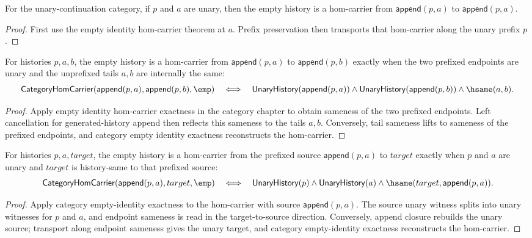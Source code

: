 \begin{theorem}
\label{thm:functor-prefix-hom-carrier-empty-identity-preserves}
For the unary-continuation category, if \(p\) and \(a\) are unary, then the
empty history is a hom-carrier from \(\mathsf{append}(p,a)\) to
\(\mathsf{append}(p,a)\).
\end{theorem}
\begin{proof}
First use the empty identity hom-carrier theorem at \(a\). Prefix preservation
then transports that hom-carrier along the unary prefix \(p\).
\end{proof}

\begin{theorem}
\label{thm:functor-prefix-hom-carrier-empty-identity-iff}
For histories \(p,a,b\), the empty history is a hom-carrier from
\(\mathsf{append}(p,a)\) to \(\mathsf{append}(p,b)\) exactly when the two
prefixed endpoints are unary and the unprefixed tails \(a,b\) are internally
the same:
$$
\mathsf{CategoryHomCarrier}(\mathsf{append}(p,a),\mathsf{append}(p,b),\emp)
\quad\Longleftrightarrow\quad
\mathsf{UnaryHistory}(\mathsf{append}(p,a))\wedge
\mathsf{UnaryHistory}(\mathsf{append}(p,b))\wedge \hsame(a,b).
$$
\end{theorem}
\begin{proof}
Apply empty identity hom-carrier exactness in the category chapter to obtain
sameness of the two prefixed endpoints. Left cancellation for generated-history
append then reflects this sameness to the tails \(a,b\). Conversely, tail
sameness lifts to sameness of the prefixed endpoints, and category empty
identity exactness reconstructs the hom-carrier.
\end{proof}

\begin{theorem}
\label{thm:functor-prefix-hom-carrier-empty-morphism-target-exactness}
For histories $p,a,target$, the empty history is a hom-carrier from the
prefixed source $\mathsf{append}(p,a)$ to $target$ exactly when $p$ and $a$ are
unary and $target$ is history-same to that prefixed source:
$$
\mathsf{CategoryHomCarrier}(\mathsf{append}(p,a),target,\emp)
\quad\Longleftrightarrow\quad
\mathsf{UnaryHistory}(p)\wedge\mathsf{UnaryHistory}(a)\wedge
\hsame(target,\mathsf{append}(p,a)).
$$
\end{theorem}
\begin{proof}
Apply category empty-identity exactness to the hom-carrier with source
$\mathsf{append}(p,a)$. The source unary witness splits into unary witnesses
for $p$ and $a$, and endpoint sameness is read in the target-to-source
direction. Conversely, append closure rebuilds the unary source; transport
along endpoint sameness gives the unary target, and category empty-identity
exactness reconstructs the hom-carrier.
\end{proof}

